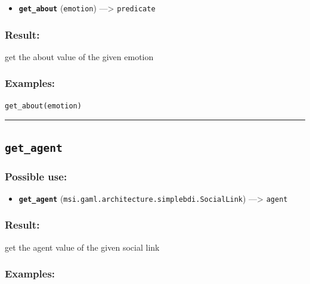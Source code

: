 \documentclass[]{book}
\providecommand{\tightlist}{%
  \setlength{\itemsep}{0pt}\setlength{\parskip}{0pt}}
\theoremstyle{definition}
\theoremstyle{definition}
\theoremstyle{definition}
\theoremstyle{remark}
\begin{document}
\begin{itemize}
\tightlist
\item
  \textbf{\texttt{get\_about}} (\texttt{emotion}) ---\textgreater{}
  \texttt{predicate}
\end{itemize}

\subsubsection{Result:}\label{result-188}

get the about value of the given emotion

\subsubsection{Examples:}\label{examples-141}

\begin{verbatim}
get_about(emotion) 
\end{verbatim}

\begin{center}\rule{0.5\linewidth}{\linethickness}\end{center}

\subsection{\texorpdfstring{\texttt{get\_agent}}{get\_agent}}\label{get_agent}

\subsubsection{Possible use:}\label{possible-use-195}

\begin{itemize}
\tightlist
\item
  \textbf{\texttt{get\_agent}}
  (\texttt{msi.gaml.architecture.simplebdi.SocialLink})
  ---\textgreater{} \texttt{agent}
\end{itemize}

\subsubsection{Result:}\label{result-189}

get the agent value of the given social link

\subsubsection{Examples:}\label{examples-142}
\end{document}
